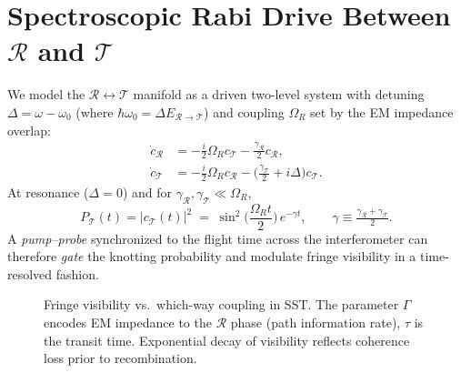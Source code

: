 \documentclass[11pt,a4paper]{article}
\begin{document}
\section{Spectroscopic Rabi Drive Between $\mathcal R$ and $\mathcal T$}

We model the $\mathcal R\leftrightarrow\mathcal T$ manifold as a driven two-level system with detuning $\Delta=\omega-\omega_0$ (where $\hbar\omega_0=\Delta E_{\mathcal R\to\mathcal T}$) and coupling $\Omega_R$ set by the EM impedance overlap:
\begin{align}
\dot c_{\mathcal R} &= -\tfrac{i}{2}\Omega_R c_{\mathcal T} - \tfrac{\gamma_{\mathcal R}}{2} c_{\mathcal R},\\
\dot c_{\mathcal T} &= -\tfrac{i}{2}\Omega_R c_{\mathcal R} - \Big(\tfrac{\gamma_{\mathcal T}}{2} + i\Delta\Big) c_{\mathcal T}.
\end{align}
At resonance ($\Delta=0$) and for $\gamma_{\mathcal R},\gamma_{\mathcal T}\ll \Omega_R$,
\begin{equation}
P_{\mathcal T}(t)=|c_{\mathcal T}(t)|^2 \;=\; \sin^2\!\Big(\frac{\Omega_R t}{2}\Big)\,e^{-\gamma t},\qquad \gamma\equiv\tfrac{\gamma_{\mathcal R}+\gamma_{\mathcal T}}{2}.
\end{equation}
A \emph{pump--probe} synchronized to the flight time across the interferometer can therefore \emph{gate} the knotting probability and modulate fringe visibility in a time-resolved fashion.


\begin{figure}[t]
\centering
{}
\caption{Fringe visibility vs.\ which-way coupling in SST.
The parameter $\Gamma$ encodes EM impedance to the $\mathcal R$ phase (path information rate),
    $\tau$ is the transit time.
    Exponential decay of visibility reflects coherence loss prior to recombination.}
\label{fig:VvsGamma}
\end{figure}
\end{document}
